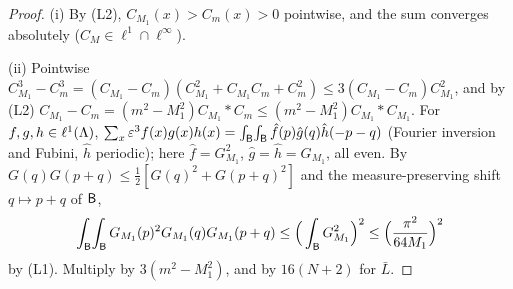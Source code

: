 \begin{proof}
(i) By (L2), $C_{M_1}(x)>C_m(x)>0$ pointwise, and the sum converges absolutely ($C_M\in\ell^1\cap\ell^\infty$).

(ii) Pointwise $C_{M_1}^3-C_m^3=(C_{M_1}-C_m)(C_{M_1}^2+C_{M_1}C_m+C_m^2)\le3(C_{M_1}-C_m)C_{M_1}^2$, and by (L2) $C_{M_1}-C_m=(m^2-M_1^2)C_{M_1}*C_m\le(m^2-M_1^2)C_{M_1}*C_{M_1}$. For $f,g,h\in\ell^1(\Lambda)$, $\sum_x\varepsilon^3f(x)g(x)h(x)=\int_{\mathsf B}\!\int_{\mathsf B}\hat f(p)\hat g(q)\hat h(-p-q)$ (Fourier inversion and Fubini, $\hat h$ periodic); here $\hat f=G_{M_1}^2$, $\hat g=\hat h=G_{M_1}$, all even. By $G(q)G(p+q)\le\frac12[G(q)^2+G(p+q)^2]$ and the measure-preserving shift $q\mapsto p+q$ of $\mathsf B$,
\[
\int_{\mathsf B}\!\int_{\mathsf B} G_{M_1}(p)^2G_{M_1}(q)G_{M_1}(p+q)\le\Big(\int_{\mathsf B} G_{M_1}^2\Big)^2\le\Big(\frac{\pi^2}{64M_1}\Big)^2
\]
by (L1). Multiply by $3(m^2-M_1^2)$, and by $16(N+2)$ for $\bar L$.


\end{proof}
